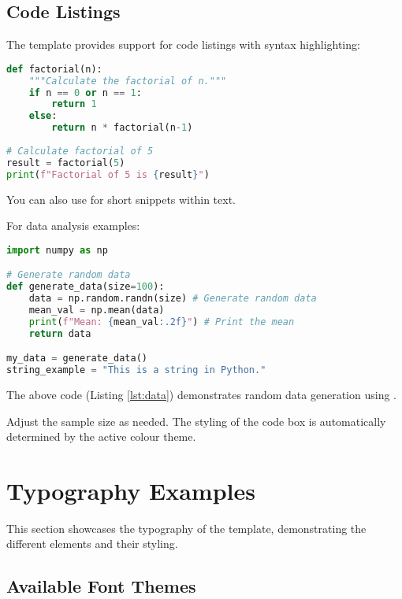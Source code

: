 \documentclass[a4paper,11pt]{article}
\begin{document}
\subsection{Code Listings}
The template provides support for code listings with syntax highlighting:

\begin{lstlisting}[language=Python, caption={Simple Python function}, label={lst:factorial}]
def factorial(n):
    """Calculate the factorial of n."""
    if n == 0 or n == 1:
        return 1
    else:
        return n * factorial(n-1)
        
# Calculate factorial of 5
result = factorial(5)
print(f"Factorial of 5 is {result}")
\end{lstlisting}

You can also use  for short snippets within text.

For data analysis examples:

\begin{lstlisting}[language=Python, caption={Python script for data generation}, label={lst:data}]
import numpy as np

# Generate random data
def generate_data(size=100):
    data = np.random.randn(size) # Generate random data
    mean_val = np.mean(data)
    print(f"Mean: {mean_val:.2f}") # Print the mean
    return data

my_data = generate_data()
string_example = "This is a string in Python."
\end{lstlisting}

\begin{exampletbox}
    The above code (Listing \ref{lst:data}) demonstrates random data generation using .

    Adjust the sample size as needed. The styling of the code box is automatically determined by the active colour theme.
\end{exampletbox}

\section{Typography Examples}

This section showcases the typography of the template, demonstrating the different elements and their styling.

\subsection{Available Font Themes}
\end{document}
